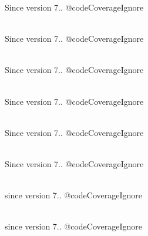 \begin{DoxyRefList}
Since version 7.. @code\+Coverage\+Ignore  
\item[Global \doxylink{class_league_1_1_uri_1_1_uri_ae43ee1cef83e2bad9c5fa1da572fc448}{Uri\+::create\+From\+String} (Stringable\texorpdfstring{$\vert$}{|}string \$uri=\textquotesingle{}\textquotesingle{})]\hfill \\
\label{deprecated__deprecated000146}%
%
Since version 7.. @code\+Coverage\+Ignore  
\item[Global \doxylink{class_league_1_1_uri_1_1_uri_a5e556d12be4e672307b69e81de0bc22d}{Uri\+::create\+From\+Unix\+Path} (string \$uri=\textquotesingle{}\textquotesingle{})]\hfill \\
\label{deprecated__deprecated000150}%
%
Since version 7.. @code\+Coverage\+Ignore  
\item[Global \doxylink{class_league_1_1_uri_1_1_uri_a49888f449031d41d0ad021f4c6a18889}{Uri\+::create\+From\+Uri} (Psr7\+Uri\+Interface\texorpdfstring{$\vert$}{|}\+Uri\+Interface \$uri)]\hfill \\
\label{deprecated__deprecated000152}%
%
Since version 7.. @code\+Coverage\+Ignore  
\item[Global \doxylink{class_league_1_1_uri_1_1_uri_a0424799af024229aa18cb84e605a7190}{Uri\+::create\+From\+Windows\+Path} (string \$uri=\textquotesingle{}\textquotesingle{})]\hfill \\
\label{deprecated__deprecated000151}%
%
Since version 7.. @code\+Coverage\+Ignore  
\item[Global \doxylink{class_league_1_1_uri_1_1_uri_a58578bfd54ea406d5c802fa4e2641c64}{Uri\+::get\+Components} ()]\hfill \\
\label{deprecated__deprecated000145}%
%
Since version 7.. @code\+Coverage\+Ignore  
\item[Class \doxylink{class_league_1_1_uri_1_1_uri_info}{Uri\+Info} ]\hfill \\
\label{deprecated__deprecated000154}%
%
since version 7.. @code\+Coverage\+Ignore  
\item[Class \doxylink{class_league_1_1_uri_1_1_uri_resolver}{Uri\+Resolver} ]\hfill \\
\label{deprecated__deprecated000155}%
%
since version 7.. @code\+Coverage\+Ignore  

\end{DoxyRefList}
